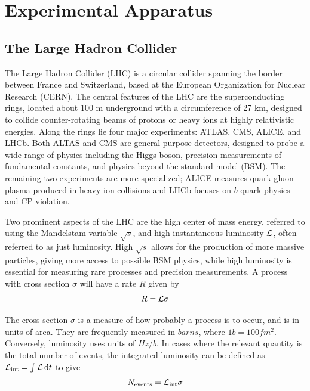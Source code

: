 
\chapter{Experimental Apparatus}
\label{chap:exp}

\section{The Large Hadron Collider} \label{sec:LHC}
The Large Hadron Collider (LHC) is a circular collider spanning the border between France and Switzerland, based at the European Organization for Nuclear Research (CERN). The central features of the LHC are the superconducting rings, located about 100 m underground with a circumference of 27 km, designed to collide counter-rotating beams of protons or heavy ions at highly relativistic energies. Along the rings lie four major experiments: ATLAS, CMS, ALICE, and LHCb. Both ALTAS and CMS are general purpose detectors, designed to probe a wide range of physics including the Higgs boson, precision measurements of fundamental constants, and physics beyond the standard model (BSM). The remaining two experiments are more specialized; ALICE measures quark gluon plasma produced in heavy ion collisions and LHCb focuses on $b$-quark physics and CP violation.

Two prominent aspects of the LHC are the high center of mass energy, referred to using the Mandelstam variable $\sqrt{s}$, and high instantaneous luminosity $\mathcal{L}$, often referred to as just luminosity. High $\sqrt{s}$ allows for the production of more massive particles, giving more access to possible BSM physics, while high luminosity is essential for measuring rare processes and precision measurements. A process with cross section $\sigma$ will have a rate $R$ given by
\begin{equation}
	R=\mathcal{L}\sigma
\end{equation}

The cross section $\sigma$ is a measure of how probably a process is to occur, and is in units of area. They are frequently measured in $\unit{barns}$, where $1\unit{b} = 100\unit{fm^2}$. Conversely, luminosity uses units of $\unit{Hz/b}$. In cases where the relevant quantity is the total number of events, the integrated luminosity can be defined as $\mathcal{L}_\mathrm{int}=\int{\mathcal{L}\dd{t}}$ to give
\begin{equation}
	N_\mathrm{events} = \mathcal{L}_\mathrm{int}\sigma
\end{equation}


